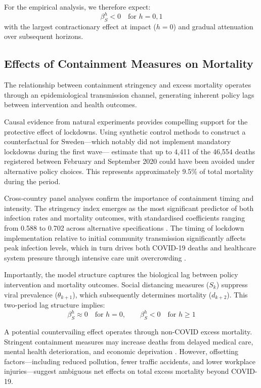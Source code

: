 \documentclass[12pt, a4paper]{article}
\begin{document}
For the empirical analysis, we therefore expect:
\begin{equation}
    \beta^h_S < 0 \quad \text{for } h = 0,1
\end{equation}
with the largest contractionary effect at impact ($h=0$) and gradual attenuation over subsequent horizons.

\subsection{Effects of Containment Measures on Mortality}
\label{subsec:stringency_mortality}

The relationship between containment stringency and excess mortality operates through an epidemiological transmission channel, generating inherent policy lags between intervention and health outcomes.

Causal evidence from natural experiments provides compelling support for the protective effect of lockdowns. Using synthetic control methods to construct a counterfactual for Sweden---which notably did not implement mandatory lockdowns during the first wave---\citet{Yarmol2023} estimate that up to 4,411 of the 46,554 deaths registered between February and September 2020 could have been avoided under alternative policy choices. This represents approximately 9.5\% of total mortality during the period.

Cross-country panel analyses confirm the importance of containment timing and intensity. The stringency index emerges as the most significant predictor of both infection rates and mortality outcomes, with standardised coefficients ranging from 0.588 to 0.702 across alternative specifications \citep{Castex2021}. The timing of lockdown implementation relative to initial community transmission significantly affects peak infection levels, which in turn drives both COVID-19 deaths and healthcare system pressure through intensive care unit overcrowding \citep{Flaxman2020}.

Importantly, the model structure captures the biological lag between policy intervention and mortality outcomes. Social distancing measures ($S_k$) suppress viral prevalence ($\theta_{k+1}$), which subsequently determines mortality ($d_{k+2}$). This two-period lag structure implies:
\begin{equation}
    \beta^h_S \approx 0 \quad \text{for } h = 0, \qquad \beta^h_S < 0 \quad \text{for } h \geq 1
\end{equation}

A potential countervailing effect operates through non-COVID excess mortality. Stringent containment measures may increase deaths from delayed medical care, mental health deterioration, and economic deprivation \citep{Kontopantelis2021}. However, offsetting factors---including reduced pollution, fewer traffic accidents, and lower workplace injuries---suggest ambiguous net effects on total excess mortality beyond COVID-19.
\end{document}
